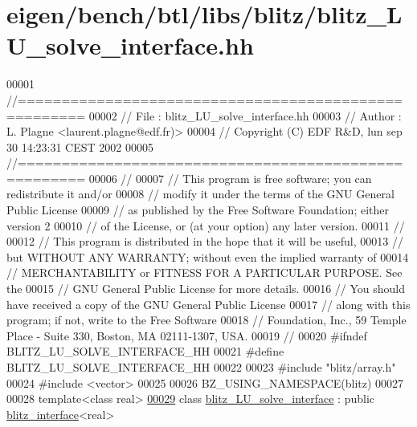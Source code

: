 \hypertarget{eigen_2bench_2btl_2libs_2blitz_2blitz___l_u__solve__interface_8hh_source}{}\section{eigen/bench/btl/libs/blitz/blitz\+\_\+\+L\+U\+\_\+solve\+\_\+interface.hh}
\label{eigen_2bench_2btl_2libs_2blitz_2blitz___l_u__solve__interface_8hh_source}

\begin{DoxyCode}
00001 \textcolor{comment}{//=====================================================}
00002 \textcolor{comment}{// File   :  blitz\_LU\_solve\_interface.hh}
00003 \textcolor{comment}{// Author :  L. Plagne <laurent.plagne@edf.fr)>        }
00004 \textcolor{comment}{// Copyright (C) EDF R&D,  lun sep 30 14:23:31 CEST 2002}
00005 \textcolor{comment}{//=====================================================}
00006 \textcolor{comment}{// }
00007 \textcolor{comment}{// This program is free software; you can redistribute it and/or}
00008 \textcolor{comment}{// modify it under the terms of the GNU General Public License}
00009 \textcolor{comment}{// as published by the Free Software Foundation; either version 2}
00010 \textcolor{comment}{// of the License, or (at your option) any later version.}
00011 \textcolor{comment}{// }
00012 \textcolor{comment}{// This program is distributed in the hope that it will be useful,}
00013 \textcolor{comment}{// but WITHOUT ANY WARRANTY; without even the implied warranty of}
00014 \textcolor{comment}{// MERCHANTABILITY or FITNESS FOR A PARTICULAR PURPOSE.  See the}
00015 \textcolor{comment}{// GNU General Public License for more details.}
00016 \textcolor{comment}{// You should have received a copy of the GNU General Public License}
00017 \textcolor{comment}{// along with this program; if not, write to the Free Software}
00018 \textcolor{comment}{// Foundation, Inc., 59 Temple Place - Suite 330, Boston, MA  02111-1307, USA.}
00019 \textcolor{comment}{// }
00020 \textcolor{preprocessor}{#ifndef BLITZ\_LU\_SOLVE\_INTERFACE\_HH}
00021 \textcolor{preprocessor}{#define BLITZ\_LU\_SOLVE\_INTERFACE\_HH}
00022 
00023 \textcolor{preprocessor}{#include "blitz/array.h"}
00024 \textcolor{preprocessor}{#include <vector>}
00025 
00026 BZ\_USING\_NAMESPACE(blitz)
00027 
00028 \textcolor{keyword}{template}<\textcolor{keyword}{class} real>
\hyperlink{classblitz___l_u__solve__interface}{00029} \textcolor{keyword}{class }\hyperlink{classblitz___l_u__solve__interface}{blitz\_LU\_solve\_interface} : \textcolor{keyword}{public} \hyperlink{classblitz__interface}{blitz\_interface}<real>

\end{DoxyCode}
